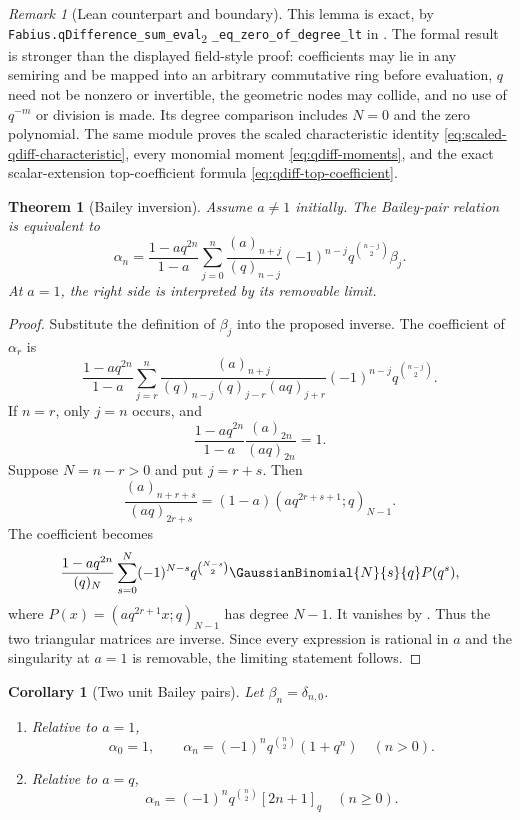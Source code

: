 \documentclass[11pt,a4paper,oneside,openany]{book}
\newtheorem{theorem}{Theorem}[chapter]
\newtheorem{corollary}[corollary]{Corollary}
\theoremstyle{definition}
\theoremstyle{remark}
\newtheorem{remark}[remark]{Remark}
\newcommand{\statusexact}{\textsf{\color{statusgreen}exact}}
\begin{document}
\begin{remark}[Lean counterpart and boundary]
This lemma is \statusexact, by
\texttt{Fabius.qDifference\_\allowbreak{}sum\_\allowbreak{}eval}\textsubscript{2}\allowbreak
\texttt{\_\allowbreak{}eq\_\allowbreak{}zero\_\allowbreak{}of\_\allowbreak{}degree\_\allowbreak{}lt} in
.  The formal result is stronger than the
displayed field-style proof: coefficients may lie in any semiring and be
mapped into an arbitrary commutative ring before evaluation, \(q\) need not
be nonzero or invertible, the geometric nodes may collide, and no use of
\(q^{-m}\) or division is made.  Its degree comparison includes \(N=0\) and
the zero polynomial.  The same module proves the scaled characteristic
identity \eqref{eq:scaled-qdiff-characteristic}, every monomial moment
\eqref{eq:qdiff-moments}, and the exact scalar-extension top-coefficient
formula \eqref{eq:qdiff-top-coefficient}.
\end{remark}

\begin{theorem}[Bailey inversion]\label{thm:bailey-inversion}
Assume $a\ne1$ initially.  The Bailey-pair relation is equivalent to
\[
 \alpha_n=\frac{1-aq^{2n}}{1-a}
 \sum_{j=0}^{n}
 \frac{(a)_{n+j}}{(q)_{n-j}}
 (-1)^{n-j}q^{\binom{n-j}{2}}\beta_j.
\]
At $a=1$, the right side is interpreted by its removable limit.
\end{theorem}

\begin{proof}
Substitute the definition of $\beta_j$ into the proposed inverse.  The coefficient of $\alpha_r$ is
\[
 \frac{1-aq^{2n}}{1-a}
 \sum_{j=r}^{n}
 \frac{(a)_{n+j}}{(q)_{n-j}(q)_{j-r}(aq)_{j+r}}
 (-1)^{n-j}q^{\binom{n-j}{2}}.
\]
If $n=r$, only $j=n$ occurs, and
\[
 \frac{1-aq^{2n}}{1-a}\frac{(a)_{2n}}{(aq)_{2n}}=1.
\]
Suppose $N=n-r>0$ and put $j=r+s$.  Then
\[
 \frac{(a)_{n+r+s}}{(aq)_{2r+s}}
 =(1-a)(aq^{2r+s+1};q)_{N-1}.
\]
The coefficient becomes
\[
 \frac{1-aq^{2n}}{(q)_N}
 \sum_{s=0}^{N}(-1)^{N-s}q^{\binom{N-s}{2}}
 \GaussianBinomial{N}{s}{q} P(q^s),
\]
where
\(
 P(x)=(aq^{2r+1}x;q)_{N-1}
\)
has degree $N-1$.  It vanishes by .  Thus the two triangular matrices are inverse.  Since every expression is rational in $a$ and the singularity at $a=1$ is removable, the limiting statement follows.
\end{proof}

\begin{corollary}[Two unit Bailey pairs]\label{cor:unit-bailey-pairs}
Let $\beta_n=\delta_{n,0}$.
\begin{enumerate}[label=\textup{(\roman*)}]
\item Relative to $a=1$,
\[
 \alpha_0=1,
 \qquad
 \alpha_n=(-1)^nq^{\binom n2}(1+q^n)\quad(n>0).
\]
\item Relative to $a=q$,
\[
 \alpha_n=(-1)^nq^{\binom n2}[2n+1]_q\quad(n\ge0).
\]
\end{enumerate}
\end{corollary}
\end{document}
